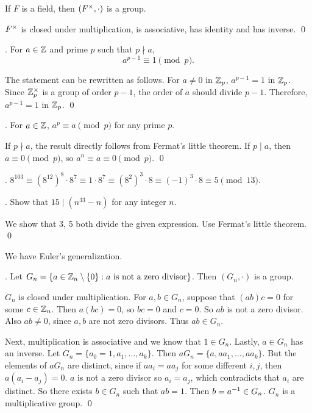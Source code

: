 
\rmk If \(F\) is a field, then \((F^\times, \cdot)\) is a group.

\pf \(F^\times\) is closed under multiplication, is associative, has identity and has inverse. \qed

\thm.  For \(a \in \mathbb{Z}\) and prime \(p\) such that \(p \nmid a\),
\[
    a^{p-1} \equiv 1 \pmod p.
\]

\pf The statement can be rewritten as follows. For \(a \neq 0\) in \(\mathbb{Z}_p\), \(a^{p-1} = 1\) in \(\mathbb{Z}_p\). Since \(\mathbb{Z}_p^\times\) is a group of order \(p - 1\), the order of \(a\) should divide \(p - 1\). Therefore, \(a^{p - 1} = 1\) in \(\mathbb{Z}_p\). \qed

\cor. For \(a \in \mathbb{Z}\), \(a^p \equiv a \pmod p\) for any prime \(p\).

\pf If \(p \nmid a\), the result directly follows from Fermat's little theorem. If \(p \mid a\), then \(a \equiv 0 \pmod p\), so \(a^n \equiv a \equiv 0 \pmod p\). \qed

\ex. \(8^{103} \equiv (8^{12})^8 \cdot 8^7 \equiv 1 \cdot 8^7 \equiv (8^2)^3 \cdot 8 \equiv (-1)^3 \cdot 8 \equiv 5 \pmod{13}\).

\ex. Show that \(15 \mid (n^{33} - n)\) for any integer \(n\).

\pf We show that 3, 5 both divide the given expression. Use Fermat's little theorem. \qed

We have Euler's generalization.

\thm. Let \(G_n = \{a \in \mathbb{Z}_n \setminus \{0\} : a \text{ is not a zero divisor}\}\). Then \((G_n, \cdot)\) is a group.

\pf \(G_n\) is closed under multiplication. For \(a, b \in G_n\), suppose that \((ab)c = 0\) for some \(c \in \mathbb{Z}_n\). Then \(a(bc) = 0\), so \(bc = 0\) and \(c = 0\). So \(ab\) is not a zero divisor. Also \(ab \neq 0\), since \(a, b\) are not zero divisors. Thus \(ab \in G_n\).

Next, multiplication is associative and we know that \(1 \in G_n\). Lastly, \(a \in G_n\) has an inverse. Let \(G_n = \{a_0 = 1, a_1, \dots, a_k\}\). Then \(a G_n = \{a, aa_1, \dots, aa_k\}\). But the elements of \(aG_n\) are distinct, since if \(aa_i = aa_j\) for some different \(i, j\), then \(a(a_i - a_j) = 0\). \(a\) is not a zero divisor so \(a_i = a_j\), which contradicts that \(a_i\) are distinct. So there exists \(b \in G_n\) such that \(ab = 1\). Then \(b = a^{-1} \in G_n\). \(G_n\) is a multiplicative group. \qed


